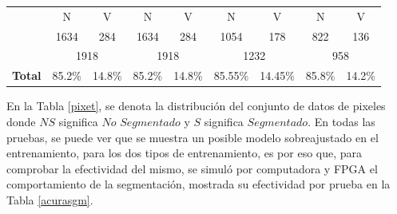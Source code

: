 \documentclass[twoside,spanish,ESP,MSc]{plantillaLabUPV}
\theoremstyle{definition}
\begin{document}
\begin{table}[!tbh]
\begin{tabular}{|c|c|c|c|c|c|c|c|c|}
		& {\color[HTML]{F56B00} N} & {\color[HTML]{009901} V} & {\color[HTML]{F56B00} N} & {\color[HTML]{009901} V} & {\color[HTML]{F56B00} N} & {\color[HTML]{009901} V} & {\color[HTML]{F56B00} N} & {\color[HTML]{009901} V} \\ \cline{2-9} 
		& 1634                     & 284                      & 1634                     & 284                      & 1054                        & 178                        & 822                        & 136                        \\
		\cline{2-9} 
		& \multicolumn{2}{c|}{1918}                           & \multicolumn{2}{c|}{1918}                           & \multicolumn{2}{c|}{1232}                           & \multicolumn{2}{c|}{958}                           \\ \cline{2-9} 
		\multirow{-4}{*}{\textbf{Total}} & 85.2\%                   & 14.8\%                   & 85.2\%                   & 14.8\%                   & 85.55\%                      & 14.45\%                      & 85.8\%                      & 14.2\%                      \\ \hline

	\end{tabular}
\end{table}


En la Tabla \ref{pixet}, se denota la distribución del conjunto de datos de pixeles donde $NS$ significa $No$ $Segmentado$  y $S$ significa $Segmentado$. En todas las pruebas, se puede ver que se muestra un posible modelo sobreajustado en el entrenamiento, para los dos tipos de entrenamiento, es por eso que, para comprobar la efectividad del mismo, se simuló por computadora y FPGA el comportamiento de la segmentación, mostrada su efectividad por prueba en la Tabla \ref{acurasgm}.
\end{document}
